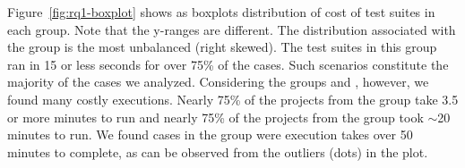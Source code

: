 Figure~\ref{fig:rq1-boxplot} shows as boxplots distribution of cost of
test suites in each group.
Note that the y-ranges are different.
The distribution associated with the \shortg{} group is the most
unbalanced (right skewed).
The test suites in this group ran in 15 or less seconds for
over 75\% of the cases.  Such scenarios constitute the majority of the
cases we analyzed.  Considering the groups \medg{} and \longg{},
however, we found many costly executions.  Nearly 75\% of the projects
from the \medg{} group take 3.5 or more minutes to run and nearly 75\% of
the projects from the \longg{} group took $\sim$20 minutes to run.  We
found cases in the \longg{} group were execution takes over 50 minutes
to complete, as can be observed from the outliers (dots) in the plot.

